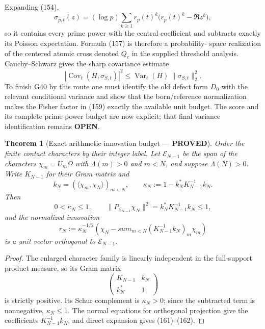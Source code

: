 \documentclass[11pt]{article}
\newtheorem{theorem}{Theorem}
\newcommand{\PROVED}{\textcolor{green!45!black}{\textbf{PROVED}}}
\newcommand{\OPEN}{\textcolor{red!70!black}{\textbf{OPEN}}}
\begin{document}
Expanding (154),
\begin{equation}
 \sigma_{p,t}(z)
 =(\log p)\sum_{k\ge1}r_p(t)^k
       \bigl(r_p(t)^k-\Re z^k\bigr),                  \tag{158}
\end{equation}
so it contains every prime power with the central coefficient and subtracts
exactly its Poisson expectation.  Formula (157) is therefore a probability-
space realization of the centered atomic cross denoted $Q_c$ in the supplied
threshold analysis.  Cauchy--Schwarz gives the sharp covariance estimate
\begin{equation}
 |\operatorname{Cov}_t(H,\sigma_{S,t})|^2
 \le\operatorname{Var}_t(H)\,
      \|\sigma_{S,t}\|_2^2.                           \tag{159}
\end{equation}
To finish G40 by this route one must identify the old defect form $D_0$ with
the relevant conditional variance and show that the born/reference
normalization makes the Fisher factor in (159) exactly the available unit
budget.  The score and its complete prime-power budget are now explicit;
that final variance identification remains \OPEN{}.

\begin{theorem}[Exact arithmetic innovation budget --- \PROVED]
Order the finite contact characters by their integer label.  Let
$\mathscr E_{N-1}$ be the span of the characters $\chi_m=U_m\Omega$ with
$\Lambda(m)>0$ and $m<N$, and suppose $\Lambda(N)>0$.  Write $K_{N-1}$ for
their Gram matrix and
\begin{equation}
 k_N=(\langle\chi_m,\chi_N\rangle)_{m<N},
 \qquad
 \kappa_N:=1-k_N^*K_{N-1}^{-1}k_N.                    \tag{160}
\end{equation}
Then
\begin{equation}
 0<\kappa_N\le1,
 \qquad
 \|P_{\mathscr E_{N-1}}\chi_N\|^2
 =k_N^*K_{N-1}^{-1}k_N\le1,                           \tag{161}
\end{equation}
and the normalized innovation
\begin{equation}
 r_N:=\kappa_N^{-1/2}
 \left(\chi_N-sum_{m<N}(K_{N-1}^{-1}k_N)_m\chi_m\right) \tag{162}
\end{equation}
is a unit vector orthogonal to $\mathscr E_{N-1}$.
\end{theorem}

\begin{proof}
The enlarged character family is linearly independent in the full-support
product measure, so its Gram matrix
\[
 \begin{pmatrix}K_{N-1}&k_N\\k_N^*&1\end{pmatrix}
\]
is strictly positive.  Its Schur complement is $\kappa_N>0$; since the
subtracted term is nonnegative, $\kappa_N\le1$.  The normal equations for
orthogonal projection give the coefficients $K_{N-1}^{-1}k_N$, and direct
expansion gives (161)--(162).
\end{proof}
\end{document}
